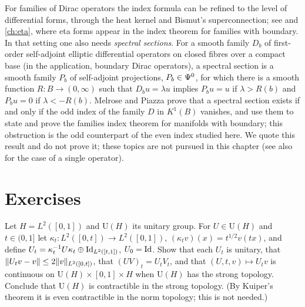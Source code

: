 \begin{remark}\label{scindex:rem:dirac}
  For families of Dirac operators the index formula can be refined to the level
  of differential forms, through the heat kernel and Bismut's superconnection;
  see \cite{Bismut-Cheeger} and \cref{ch:eta}, where eta forms appear in the
  index theorem for families with boundary. In that setting one also needs
  \emph{spectral sections}. For a smooth family $D_b$ of first-order
  self-adjoint elliptic differential operators on closed fibres over a compact
  base (in the application, boundary Dirac operators), a spectral section is
  a smooth family $P_b$ of
  self-adjoint projections, $P_b\in\Psi^{0}$, for which there is a smooth function
  $R:B\to(0,\infty)$ such that $D_bu=\lambda u$ implies $P_bu=u$ if
  $\lambda>R(b)$ and $P_bu=0$ if $\lambda<-R(b)$. Melrose and Piazza
  \cite[Proposition~1]{Melrose-Piazza} prove that a
  spectral section exists if and only if the odd index of the family $D$ in
  $K^{1}(B)$ vanishes, and use them to state and prove the families index theorem
  for manifolds with boundary; this obstruction is the odd counterpart of the
  even index studied here. We quote this result and do not prove it; these topics
  are not pursued in this chapter (see also \cite{Melrose-APS} for the case of a
  single operator).
\end{remark}

\section{Exercises}

\begin{exercise}\label{scindex:ex:strong}
  Let $H=L^2([0,1])$ and $\mathrm U(H)$ its unitary group. For $U\in\mathrm U(H)$
  and $t\in(0,1]$ let $\kappa_t:L^2([0,t])\to L^2([0,1])$,
  $(\kappa_tv)(x)=t^{1/2}v(tx)$, and define $U_t=\kappa_t^{-1}U\kappa_t\oplus
  \operatorname{Id}_{L^2([t,1])}$, $U_0=\operatorname{Id}$. Show that each $U_t$ is unitary, that
  $\lVert U_tv-v\rVert\le2\lVert v\rVert_{L^2([0,t])}$, that $(UV)_t=U_tV_t$, and that
  $(U,t,v)\mapsto U_tv$ is continuous on $\mathrm U(H)\times[0,1]\times H$ when
  $\mathrm U(H)$ has the strong topology. Conclude that $\mathrm U(H)$ is
  contractible in the strong topology. (By Kuiper's theorem it is even
  contractible in the norm topology; this is not needed.)
\end{exercise}

